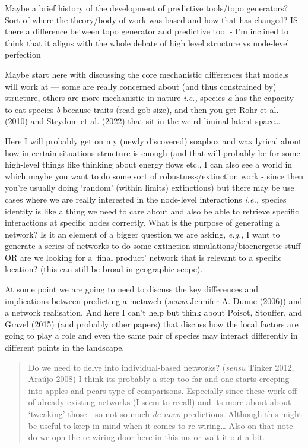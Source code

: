 \documentclass[
  letterpaper,
  DIV=11,
  numbers=noendperiod]{scrartcl}
\begin{document}
Maybe a brief history of the development of predictive tools/topo
generators? Sort of where the theory/body of work was based and how that
has changed? IS there a difference between topo generator and predictive
tool - I'm inclined to think that it aligns with the whole debate of
high level structure vs node-level perfection

Maybe start here with discussing the core mechanistic differences that
models will work at --- some are really concerned about (and thus
constrained by) structure, others are more mechanistic in nature
\emph{i.e.,} species \emph{a} has the capacity to eat species \emph{b}
because traits (read gob size), and then you get Rohr et al. (2010) and
Strydom et al. (2022) that sit in the weird liminal latent space\ldots{}

Here I will probably get on my (newly discovered) soapbox and wax
lyrical about how in certain situations structure is enough (and that
will probably be for some high-level things like thinking about energy
flows etc., I can also see a world in which maybe you want to do some
sort of robustness/extinction work - since then you're usually doing
`random' (within limits) extinctions) but there may be use cases where
we are really interested in the node-level interactions \emph{i.e.,}
species identity is like a thing we need to care about and also be able
to retrieve specific interactions at specific nodes correctly. What is
the purpose of generating a network? Is it an element of a bigger
question we are asking, \emph{e.g.,} I want to generate a series of
networks to do some extinction simulations/bioenergetic stuff OR are we
looking for a `final product' network that is relevant to a specific
location? (this can still be broad in geographic scope).

At some point we are going to need to discuss the key differences and
implications between predicting a metaweb (\emph{sensu} Jennifer A.
Dunne (2006)) and a network realisation. And here I can't help but think
about Poisot, Stouffer, and Gravel (2015) (and probably other papers)
that discuss how the local factors are going to play a role and even the
same pair of species may interact differently in different points in the
landscape.

\begin{quote}
Do we need to delve into individual-based networks? (\emph{sensu} Tinker
2012, Araújo 2008) I think its probably a step too far and one starts
creeping into apples and pears type of comparisons. Especially since
these work off of already existing networks (I seem to recall) and its
more about about `tweaking' those - so not so much \emph{de novo}
predictions. Although this might be useful to keep in mind when it comes
to re-wiring\ldots{} Also on that note do we opn the re-wiring door here
in this ms or wait it out a bit.
\end{quote}
\end{document}
